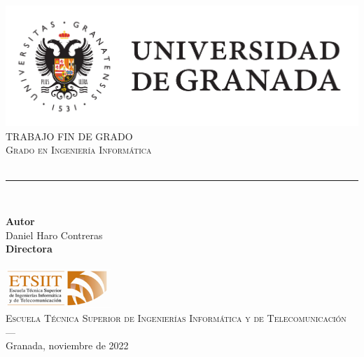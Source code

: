 \begin{titlepage}
 
 
\newlength{\centeroffset}
\setlength{\centeroffset}{-0.5\oddsidemargin}
\addtolength{\centeroffset}{0.5\evensidemargin}
\thispagestyle{empty}

\noindent\hspace*{\centeroffset}\begin{minipage}{\textwidth}

\centering
\includegraphics[width=\textwidth]{imagenes/logo_ugr.pdf}\\[1.4cm]

\textsc{ \Large TRABAJO FIN DE GRADO\\[0.2cm]}
\textsc{ Grado en Ingeniería Informática }\\[1cm]
% 
{\Huge\bfseries \myTitle \\
}
\noindent\rule[-1ex]{\textwidth}{3pt}\\[3.5ex]
\end{minipage}

\vspace{2.5cm}
\noindent\hspace*{\centeroffset}\begin{minipage}{\textwidth}
\centering

\textbf{Autor}\\ {Daniel Haro Contreras}\\[2.5ex]
\textbf{Directora}\\
{\myProf}\\[1cm]
\includegraphics[width=0.3\textwidth]{imagenes/etsiit_logo.png}\\[0.1cm]
\textsc{Escuela Técnica Superior de Ingenierías Informática y de Telecomunicación}\\
\textsc{---}\\
Granada, noviembre de 2022
\end{minipage}
\end{titlepage}


